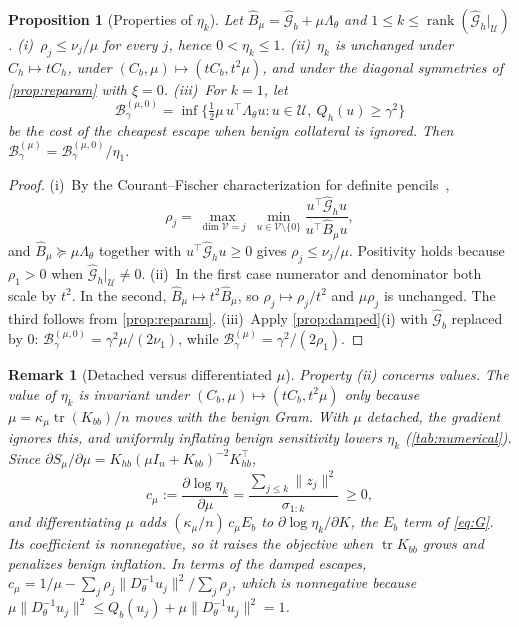 \documentclass[11pt]{article}
\newtheorem{proposition}{Proposition}
\newtheorem{remark}{Remark}
\newcommand{\Ghh}{\widehat{\mathcal{G}}_{h}}
\newcommand{\Gbh}{\widehat{\mathcal{G}}_{b}}
\newcommand{\Barrier}{\mathcal{B}}
\newcommand{\U}{\mathcal{U}}
\newcommand{\Lam}{\Lambda_{\theta}}
\newcommand{\Bmu}{\widehat{B}_{\mu}}
\newcommand{\Ch}{C_{h}}
\newcommand{\Cb}{C_{b}}
\newcommand{\etak}{\eta_{k}}
\newcommand{\tr}{\operatorname{tr}}
\newcommand{\Smu}{S_{\mu}}
\begin{document}
\begin{proposition}[Properties of $\etak$]
\label{prop:eta}
Let $\Bmu=\Gbh+\mu\Lam$ and $1\le k\le\operatorname{rank}(\Ghh|_\U)$.
(i)~$\rho_j\le\nu_j/\mu$ for every $j$, hence $0<\etak\le1$.
(ii)~$\etak$ is unchanged under $\Ch\mapsto t\Ch$, under $(\Cb,\mu)\mapsto(t\Cb,t^2\mu)$, and under the diagonal symmetries of \cref{prop:reparam} with $\xi=0$.
(iii)~For $k=1$, let
\begin{equation*}
\Barrier^{(\mu,0)}_\gamma=\inf\bigl\{\tfrac12\mu\,u^\top\Lam u:u\in\U,\ Q_h(u)\ge\gamma^2\bigr\}
\end{equation*}
be the cost of the cheapest escape when benign collateral is ignored. Then $\Barrier^{(\mu)}_\gamma=\Barrier^{(\mu,0)}_\gamma/\eta_1$.
\end{proposition}
\begin{proof}
(i)~By the Courant--Fischer characterization for definite pencils~\citep{parlett1998symmetric},
\begin{equation*}
\rho_j=\max_{\dim\mathcal V=j}\ \min_{u\in\mathcal V\setminus\{0\}}\frac{u^\top\Ghh u}{u^\top\Bmu u},
\end{equation*}
and $\Bmu\succeq\mu\Lam$ together with $u^\top\Ghh u\ge0$ gives $\rho_j\le\nu_j/\mu$. Positivity holds because $\rho_1>0$ when $\Ghh|_\U\ne0$.
(ii)~In the first case numerator and denominator both scale by $t^2$. In the second, $\Bmu\mapsto t^2\Bmu$, so $\rho_j\mapsto\rho_j/t^2$ and $\mu\rho_j$ is unchanged. The third follows from \cref{prop:reparam}.
(iii)~Apply \cref{prop:damped}(i) with $\Gbh$ replaced by $0$: $\Barrier^{(\mu,0)}_\gamma=\gamma^2\mu/(2\nu_1)$, while $\Barrier^{(\mu)}_\gamma=\gamma^2/(2\rho_1)$.
\end{proof}

\begin{remark}[Detached versus differentiated $\mu$]
\label{rem:mu}
Property (ii) concerns values. The value of $\etak$ is invariant under $(\Cb,\mu)\mapsto(t\Cb,t^2\mu)$ only because $\mu=\kappa_\mu\tr(K_{bb})/n$ moves with the benign Gram. With $\mu$ detached, the gradient ignores this, and uniformly inflating benign sensitivity lowers $\etak$ (\cref{tab:numerical}). Since $\partial\Smu/\partial\mu=K_{hb}(\mu I_n+K_{bb})^{-2}K_{hb}^\top$,
\begin{equation*}
c_\mu:=\frac{\partial\log\etak}{\partial\mu}=\frac{\sum_{j\le k}\|z_j\|^2}{\sigma_{1:k}}\ \ge0,
\end{equation*}
and differentiating $\mu$ adds $(\kappa_\mu/n)\,c_\mu E_b$ to $\partial\log\etak/\partial K$, the $E_b$ term of \cref{eq:G}. Its coefficient is nonnegative, so it raises the objective when $\tr K_{bb}$ grows and penalizes benign inflation. In terms of the damped escapes, $c_\mu=1/\mu-\sum_j\rho_j\|D_\theta^{-1}u_j\|^2/\sum_j\rho_j$, which is nonnegative because $\mu\|D_\theta^{-1}u_j\|^2\le Q_b(u_j)+\mu\|D_\theta^{-1}u_j\|^2=1$.
\end{remark}
\end{document}
